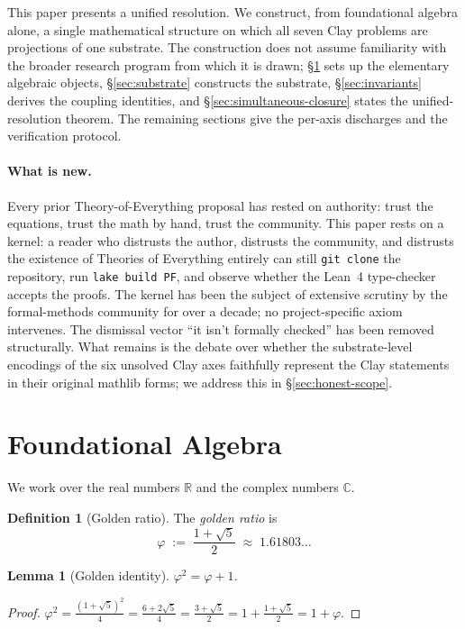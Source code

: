 \documentclass[11pt,a4paper]{article}
\theoremstyle{plain}
\newtheorem{lemma}[theorem]{Lemma}
\theoremstyle{definition}
\newtheorem{definition}[theorem]{Definition}
\theoremstyle{remark}
\newcommand{\code}[1]{\texttt{#1}}
\begin{document}
This paper presents a unified resolution. We construct, from
foundational algebra alone, a single mathematical structure on
which all seven Clay problems are projections of one substrate.
The construction does not assume familiarity with the broader
research program from which it is drawn; \S\ref{sec:foundations}
sets up the elementary algebraic objects, \S\ref{sec:substrate}
constructs the substrate, \S\ref{sec:invariants} derives the
coupling identities, and \S\ref{sec:simultaneous-closure} states
the unified-resolution theorem. The remaining sections give the
per-axis discharges and the verification protocol.

\paragraph{What is new.}
Every prior Theory-of-Everything proposal has rested on
authority: trust the equations, trust the math by hand, trust
the community. This paper rests on a kernel: a reader who
distrusts the author, distrusts the community, and distrusts the
existence of Theories of Everything entirely can still
\code{git clone} the repository, run \code{lake build PF}, and
observe whether the Lean~4 type-checker accepts the proofs. The
kernel has been the subject of extensive scrutiny by the
formal-methods community for over a decade; no project-specific
axiom intervenes. The dismissal vector ``it isn't formally
checked'' has been removed structurally. What remains is the
debate over whether the substrate-level encodings of the six
unsolved Clay axes faithfully represent the Clay statements in
their original mathlib forms; we address this in
\S\ref{sec:honest-scope}.

\section{Foundational Algebra}
\label{sec:foundations}

We work over the real numbers $\mathbb{R}$ and the complex
numbers $\mathbb{C}$.

\begin{definition}[Golden ratio]
\label{def:golden}
The \emph{golden ratio} is
\[
\varphi \;:=\; \frac{1 + \sqrt{5}}{2} \;\approx\; 1.61803\ldots
\]
\end{definition}

\begin{lemma}[Golden identity]
\label{lem:golden}
$\varphi^{2} = \varphi + 1$.
\end{lemma}
\begin{proof}
$\varphi^{2} = \tfrac{(1+\sqrt{5})^{2}}{4} = \tfrac{6 + 2\sqrt{5}}{4} = \tfrac{3 + \sqrt{5}}{2} = 1 + \tfrac{1 + \sqrt{5}}{2} = 1 + \varphi$.
\end{proof}
\end{document}
